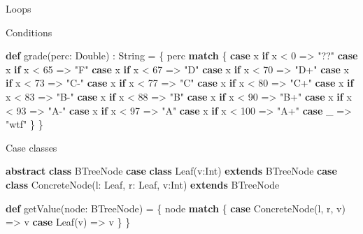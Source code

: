 \documentclass[ignorenonframetext,]{beamer}
\newenvironment{Shaded}{\begin{snugshade}}{\end{snugshade}}
\newcommand{\KeywordTok}[1]{\textcolor[rgb]{0.13,0.29,0.53}{\textbf{#1}}}
\newcommand{\DecValTok}[1]{\textcolor[rgb]{0.00,0.00,0.81}{#1}}
\newcommand{\StringTok}[1]{\textcolor[rgb]{0.31,0.60,0.02}{#1}}
\newcommand{\FunctionTok}[1]{\textcolor[rgb]{0.00,0.00,0.00}{#1}}
\newcommand{\NormalTok}[1]{#1}
\begin{document}
\begin{frame}[fragile]{Loops}
\begin{block}{Conditions}
\begin{Shaded}
\begin{Highlighting}[]
\KeywordTok{def} \FunctionTok{grade}\NormalTok{(perc: Double) : String = \{}
\NormalTok{  perc }\KeywordTok{match}\NormalTok{ \{}
    \KeywordTok{case}\NormalTok{ x }\KeywordTok{if}\NormalTok{ x < }\DecValTok{0}\NormalTok{ => }\StringTok{"??"}
    \KeywordTok{case}\NormalTok{ x }\KeywordTok{if}\NormalTok{ x < }\DecValTok{65}\NormalTok{ => }\StringTok{"F"}
    \KeywordTok{case}\NormalTok{ x }\KeywordTok{if}\NormalTok{ x < }\DecValTok{67}\NormalTok{ => }\StringTok{"D"}
    \KeywordTok{case}\NormalTok{ x }\KeywordTok{if}\NormalTok{ x < }\DecValTok{70}\NormalTok{ => }\StringTok{"D+"}
    \KeywordTok{case}\NormalTok{ x }\KeywordTok{if}\NormalTok{ x < }\DecValTok{73}\NormalTok{ => }\StringTok{"C-"}
    \KeywordTok{case}\NormalTok{ x }\KeywordTok{if}\NormalTok{ x < }\DecValTok{77}\NormalTok{ => }\StringTok{"C"}
    \KeywordTok{case}\NormalTok{ x }\KeywordTok{if}\NormalTok{ x < }\DecValTok{80}\NormalTok{ => }\StringTok{"C+"}
    \KeywordTok{case}\NormalTok{ x }\KeywordTok{if}\NormalTok{ x < }\DecValTok{83}\NormalTok{ => }\StringTok{"B-"}
    \KeywordTok{case}\NormalTok{ x }\KeywordTok{if}\NormalTok{ x < }\DecValTok{88}\NormalTok{ => }\StringTok{"B"}
    \KeywordTok{case}\NormalTok{ x }\KeywordTok{if}\NormalTok{ x < }\DecValTok{90}\NormalTok{ => }\StringTok{"B+"}
    \KeywordTok{case}\NormalTok{ x }\KeywordTok{if}\NormalTok{ x < }\DecValTok{93}\NormalTok{ => }\StringTok{"A-"}
    \KeywordTok{case}\NormalTok{ x }\KeywordTok{if}\NormalTok{ x < }\DecValTok{97}\NormalTok{ => }\StringTok{"A"}
    \KeywordTok{case}\NormalTok{ x }\KeywordTok{if}\NormalTok{ x < }\DecValTok{100}\NormalTok{ => }\StringTok{"A+"}
    \KeywordTok{case}\NormalTok{ _ => }\StringTok{"wtf"}
\NormalTok{  \}}
\NormalTok{\}}
\end{Highlighting}
\end{Shaded}

\end{block}

\begin{block}{Case classes}

\begin{Shaded}
\begin{Highlighting}[]
\KeywordTok{abstract} \KeywordTok{class}\NormalTok{ BTreeNode}
\KeywordTok{case} \KeywordTok{class} \FunctionTok{Leaf}\NormalTok{(v:Int) }\KeywordTok{extends}\NormalTok{ BTreeNode}
\KeywordTok{case} \KeywordTok{class} \FunctionTok{ConcreteNode}\NormalTok{(l: Leaf, r: Leaf, v:Int) }\KeywordTok{extends}\NormalTok{ BTreeNode}

\KeywordTok{def} \FunctionTok{getValue}\NormalTok{(node: BTreeNode) = \{}
\NormalTok{    node }\KeywordTok{match}\NormalTok{ \{}
         \KeywordTok{case} \FunctionTok{ConcreteNode}\NormalTok{(l, r, v) => v}
         \KeywordTok{case} \FunctionTok{Leaf}\NormalTok{(v) => v}
\NormalTok{    \}}
\NormalTok{\}}
\end{Highlighting}
\end{Shaded}

\end{block}

\end{frame}
\end{document}
